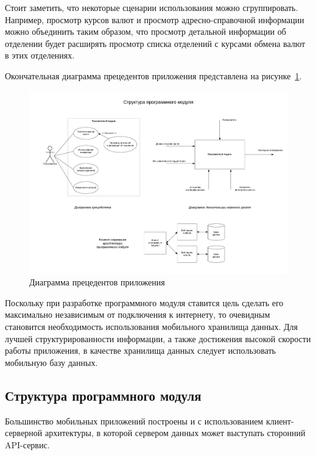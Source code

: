 Стоит заметить, что некоторые сценарии использования можно сгруппировать.
Например, просмотр курсов валют и просмотр адресно-справочной информации можно
объединить таким образом, что просмотр детальной информации об отделении будет
расширять просмотр списка отделений с курсами обмена валют в этих отделениях.

Окончательная диаграмма прецедентов приложения
представлена на рисунке~\ref{fig:use_case}.
\begin{figure}[h!]
  \centering
  \includegraphics[width=140mm]{fig/use_case}
  \caption{Диаграмма прецедентов приложения}
  \label{fig:use_case}
\end{figure}

Поскольку при разработке программного модуля ставится цель сделать его
максимально независимым от подключения к интернету, то очевидным становится
необходимость использования мобильного хранилища данных. Для лучшей
структурированности информации, а также достижения высокой скорости работы приложения,
в качестве хранилища данных следует использовать мобильную базу данных.

\pagebreak



\subsection{Структура программного модуля}

Большинство мобильных приложений построены и с использованием клиент-серверной
архитектуры, в которой сервером данных может выступать сторонний API-сервис.

